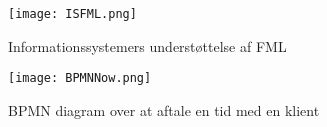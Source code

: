 \begin{figure}[H]
    \caption{Informationssystemers understøttelse af FML}
    \centering
        \texttt{[image: ISFML.png]}
    \label{forretning:isfml}
\end{figure}

\begin{figure}
    \caption{BPMN diagram over at aftale en tid med en klient}
    \centering
        \texttt{[image: BPMNNow.png]}
    \label{forretning:bpmnnow}
\end{figure}
